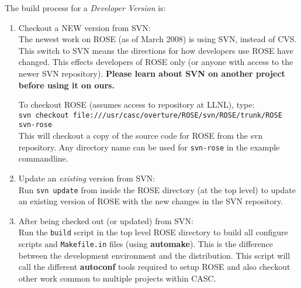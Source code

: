 The build process for a {\em Developer Version} is:
\begin{enumerate}
     \item Checkout a NEW version from SVN: \\
     The newest work on ROSE (as of March 2008) is using SVN, instead of CVS.
     This switch to SVN means the directions for how developers use ROSE have
     changed.  This effects developers of ROSE only (or anyone with access to 
     the newer SVN repository).
     {\bf Please learn about SVN on another project before using it on ours.}

     To checkout ROSE (assumes access to repository at LLNL), type: \\
     {\tt svn checkout file:///usr/casc/overture/ROSE/svn/ROSE/trunk/ROSE svn-rose} \\
     This will checkout a copy of the source code for ROSE from the svn repository.
     Any directory name can be used for {\tt svn-rose} in the example commandline.

     \item  Update an {\em existing} version from SVN: \\
     Run {\tt svn update} from inside the ROSE directory (at the top level) to update
     an existing version of ROSE with the new changes in the SVN repository.

     \item After being checked out (or updated) from SVN: \\
     Run the {\tt build} script in the top level ROSE directory to build all configure scripts
     and {\tt Makefile.in} files (using {\bf automake}).  This is the difference between the development
     environment and the distribution. This script will call the different {\bf autoconf}
     tools required to setup ROSE and also checkout other work common to multiple projects
     within CASC.


\end{enumerate}
